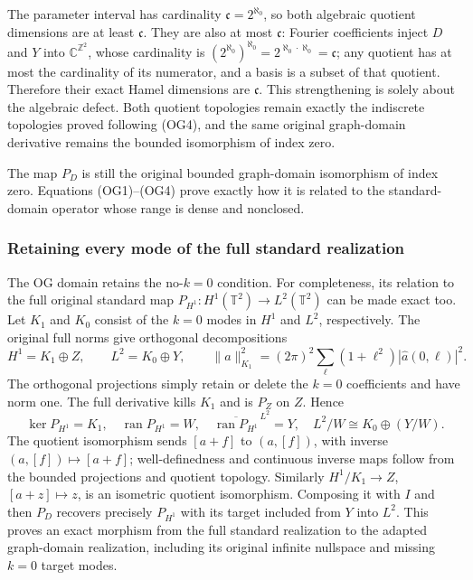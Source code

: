 \documentclass[
  11pt,
]{article}
\makeatletter
\let\ReaderOriginalAnchorStart\hyper@anchorstart
\let\ReaderOriginalAnchorEnd\hyper@anchorend
\let\ReaderPendingAliases\@empty
\def\ReaderArmAliases#1{\gdef\ReaderPendingAliases{#1}}
\def\hyper@anchorstart#1{\ReaderIfNativeAnchorTF{#1}{\ReaderPendingAliases\global\let\ReaderPendingAliases\@empty}{}\ReaderOriginalAnchorStart{#1}}
\makeatother
\begin{document}
The parameter interval has cardinality \(\mathfrak c=2^{\aleph_0}\), so
both algebraic quotient dimensions are at least \(\mathfrak c\). They
are also at most \(\mathfrak c\): Fourier coefficients inject \(D\) and
\(Y\) into \(\mathbb C^{\mathbb Z^2}\), whose cardinality is
\((2^{\aleph_0})^{\aleph_0}=2^{\aleph_0\cdot\aleph_0}=\mathfrak c\); any
quotient has at most the cardinality of its numerator, and a basis is a
subset of that quotient. Therefore their exact Hamel dimensions are
\(\mathfrak c\). This strengthening is solely about the algebraic
defect. Both quotient topologies remain exactly the indiscrete
topologies proved following (OG4), and the same original graph-domain
derivative remains the bounded isomorphism of index zero.

The map \(P_D\) is still the original bounded graph-domain isomorphism
of index zero. Equations (OG1)--(OG4) prove exactly how it is related to
the standard-domain operator whose range is dense and nonclosed.

\ReaderArmAliases{\ReaderOriginalAnchorStart{retaining-every-mode-of-the-full-standard-realization}\ReaderOriginalAnchorEnd}
\subsubsection{Retaining every mode of the full standard
realization}\label{retaining-every-mode-of-the-full-standard-realization}

The OG domain retains the no-\(k=0\) condition. For completeness, its
relation to the full original standard map
\(P_{H^1}:H^1(\mathbb T^2)\to L^2(\mathbb T^2)\) can be made exact too.
Let \(K_1\) and \(K_0\) consist of the \(k=0\) modes in \(H^1\) and
\(L^2\), respectively. The original full norms give orthogonal
decompositions \[
H^1=K_1\oplus Z,
\qquad L^2=K_0\oplus Y,
\qquad
\|a\|_{K_1}^2=(2\pi)^2\sum_\ell(1+\ell^2)|\widehat a(0,\ell)|^2.
\tag{OG10}
\] The orthogonal projections simply retain or delete the \(k=0\)
coefficients and have norm one. The full derivative kills \(K_1\) and is
\(P_Z\) on \(Z\). Hence \[
\ker P_{H^1}=K_1,
\quad\operatorname{ran}P_{H^1}=W,
\quad\overline{\operatorname{ran}P_{H^1}}^{\,L^2}=Y,
\quad L^2/W\cong K_0\oplus(Y/W).
\tag{OG11}
\] The quotient isomorphism sends \([a+f]\) to \((a,[f])\), with inverse
\((a,[f])\mapsto[a+f]\); well-definedness and continuous inverse maps
follow from the bounded projections and quotient topology. Similarly
\(H^1/K_1\to Z\), \([a+z]\mapsto z\), is an isometric quotient
isomorphism. Composing it with \(I\) and then \(P_D\) recovers precisely
\(P_{H^1}\) with its target included from \(Y\) into \(L^2\). This
proves an exact morphism from the full standard realization to the
adapted graph-domain realization, including its original infinite
nullspace and missing \(k=0\) target modes.
\end{document}
